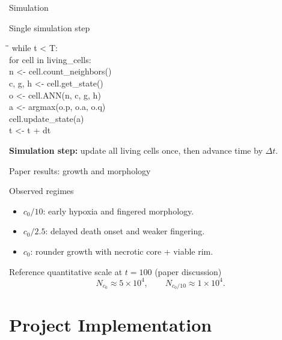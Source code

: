 \documentclass[10pt,aspectratio=169]{beamer}
\begin{document}
\begin{frame}[c]{Simulation}
\begin{exampleblock}{Single simulation step}
\centering
\begin{minipage}{0.92\textwidth}
\large
\ttfamily
\begin{tabbing}
\hspace*{1.6em}\=\hspace*{1.6em}\=\kill
while t < T:\\[0.20em]
\>for cell in living\_cells:\\
\>\>n <- cell.count\_neighbors()\\
\>\>c, g, h <- cell.get\_state()\\
\>\>o <- cell.ANN(n, c, g, h)\\
\>\>a <- argmax(o.p, o.a, o.q)\\
\>\>cell.update\_state(a)\\[0.20em]
\>t <- t + dt
\end{tabbing}
\end{minipage}
\end{exampleblock}
\vspace{0.2em}
\centering
\normalsize\textbf{Simulation step:} update all living cells once, then advance time by $\Delta t$.
\end{frame}

\begin{frame}[c]{Paper results: growth and morphology}
\begin{block}{Observed regimes}
\begin{itemize}
  \item $c_0/10$: early hypoxia and fingered morphology.
  \item $c_0/2.5$: delayed death onset and weaker fingering.
  \item $c_0$: rounder growth with necrotic core + viable rim.
\end{itemize}
\end{block}
\begin{exampleblock}{Reference quantitative scale at $t=100$ (paper discussion)}
\[
N_{c_0}\approx 5\times 10^4,
\qquad
N_{c_0/10}\approx 1\times 10^4.
\]
\end{exampleblock}
\end{frame}


\section{Project Implementation}
\end{document}
